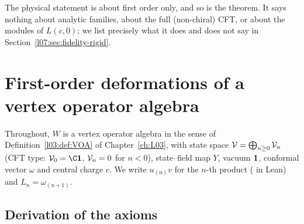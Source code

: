 The physical statement is about first order only, and so is the theorem. It says nothing about
analytic families, about the full (non-chiral) CFT, or about the modules of $L(c,0)$; we list
precisely what it does and does not say in Section~\ref{l07:sec:fidelity-rigid}.

\section{First-order deformations of a vertex operator algebra}\label{l07:sec:deformations}

Throughout, $W$ is a vertex operator algebra in the sense of Definition~\ref{l03:def:VOA} of
Chapter~\ref{ch:L03}, with state space $\mathcal{V} = \bigoplus_{n\ge0}\mathcal{V}_n$ (CFT type:
$\lsevenV_0 = \C\lsevenvac$, $\mathcal{V}_n = 0$ for $n<0$), state--field map $Y$, vacuum $\mathbf{1}$,
conformal vector $\omega$ and central charge $c$. We write $u_{(n)}v$ for the $n$-th product
( in Lean) and $L_n = \omega_{(n+1)}$.

\subsection{Derivation of the axioms}\label{l07:sec:derivation}

